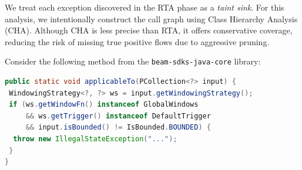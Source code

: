 

We treat each exception discovered in the RTA phase as a \textit{taint sink}. For this analysis, we intentionally construct the call graph using Class Hierarchy Analysis (CHA). Although CHA is less precise than RTA, it offers conservative coverage, reducing the risk of missing true positive flows due to aggressive pruning.

Consider the following method from the \texttt{beam-sdks-java-core} library:

\begin{lstlisting}[language=Java,breaklines=true,breakatwhitespace=false,basicstyle=\scriptsize\ttfamily]
public static void applicableTo(PCollection<?> input) {
 WindowingStrategy<?, ?> ws = input.getWindowingStrategy();
 if (ws.getWindowFn() instanceof GlobalWindows
     && ws.getTrigger() instanceof DefaultTrigger
     && input.isBounded() != IsBounded.BOUNDED) {
  throw new IllegalStateException("...");
 }
}
\end{lstlisting}

